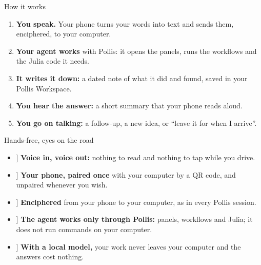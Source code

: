 \documentclass[10pt,a4paper]{article}
\newcommand{\listicon}[1]{\makebox[1.25em][c]{\color{deepamber}#1}}
\begin{document}
\vspace{4mm}
\begin{minipage}[t]{0.485\linewidth}\vspace{0pt}
\begin{pbox}[equal height group=vl1]{How it works}
\begin{enumerate}[label={\color{amber}\bfseries\arabic*}, leftmargin=5mm, itemsep=3pt, topsep=2pt]
  \item \textbf{You speak.} Your phone turns your words into text and sends them, enciphered, to your computer.
  \item \textbf{Your agent works} with Pollis: it opens the panels, runs the workflows and the Julia code it needs.
  \item \textbf{It writes it down:} a dated note of what it did and found, saved in your Pollis Workspace.
  \item \textbf{You hear the answer:} a short summary that your phone reads aloud.
  \item \textbf{You go on talking:} a follow-up, a new idea, or ``leave it for when I arrive''.
\end{enumerate}
\end{pbox}
\end{minipage}\hfill
\begin{minipage}[t]{0.485\linewidth}\vspace{0pt}
\begin{pbox}[equal height group=vl1]{Hands-free, eyes on the road}
\begin{itemize}[leftmargin=1.7em]
  \item[\listicon{\faMicrophone}] \textbf{Voice in, voice out:} nothing to read and nothing to tap while you drive.
  \item[\listicon{\faQrcode}] \textbf{Your phone, paired once} with your computer by a QR code, and unpaired whenever you wish.
  \item[\listicon{\faLock}] \textbf{Enciphered} from your phone to your computer, as in every Pollis session.
  \item[\listicon{\faShield*}] \textbf{The agent works only through Pollis:} panels, workflows and Julia; it does not run commands on your computer.
  \item[\listicon{\faHome}] \textbf{With a local model,} your work never leaves your computer and the answers cost nothing.
\end{itemize}
\end{pbox}
\end{minipage}
\end{document}
